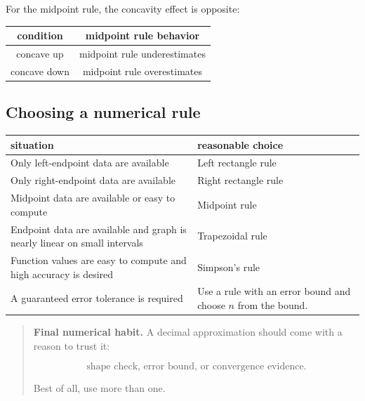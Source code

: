 For the midpoint rule, the concavity effect is opposite:

\begin{center}
\renewcommand{\arraystretch}{1.6}
\begin{tabular}{c|c}
\textbf{condition} & \textbf{midpoint rule behavior} \\ \hline
concave up & midpoint rule underestimates \\
concave down & midpoint rule overestimates
\end{tabular}
\end{center}

\subsection{Choosing a numerical rule}
\label{appsubsec:choosing-numerical-rule}

\begin{center}
\renewcommand{\arraystretch}{1.7}
\begin{tabular}{p{}|p{}}
\textbf{situation} & \textbf{reasonable choice} \\ \hline

Only left-endpoint data are available &
Left rectangle rule \\

Only right-endpoint data are available &
Right rectangle rule \\

Midpoint data are available or easy to compute &
Midpoint rule \\

Endpoint data are available and graph is nearly linear on small intervals &
Trapezoidal rule \\

Function values are easy to compute and high accuracy is desired &
Simpson's rule \\

A guaranteed error tolerance is required &
Use a rule with an error bound and choose \(n\) from the bound.
\end{tabular}
\end{center}

\begin{quote}
\textbf{Final numerical habit.}
A decimal approximation should come with a reason to trust it:

\[
\text{shape check, error bound, or convergence evidence.}
\]

Best of all, use more than one.
\end{quote}